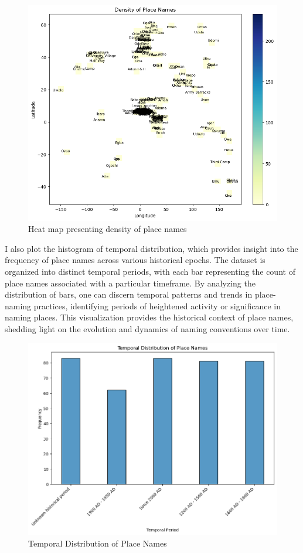 \begin{figure}[h!]
    \centering
    \includegraphics[width=1\linewidth]{heatmap1.png}
    \caption{Heat map presenting density of place names}
    \label{fig:heatmap}
\end{figure}
\newpage
I also plot the histogram of temporal distribution, which provides insight into the frequency of place names across various historical epochs. The dataset is organized into distinct temporal periods, with each bar representing the count of place names associated with a particular timeframe. By analyzing the distribution of bars, one can discern temporal patterns and trends in place-naming practices, identifying periods of heightened activity or significance in naming places. This visualization provides the historical context of place names, shedding light on the evolution and dynamics of naming conventions over time.

\begin{figure}
    \centering
    \includegraphics[width=1\linewidth]{output2.png}
    \caption{Temporal Distribution of Place Names}
    \label{fig:histgram}
\end{figure}
\newpage


